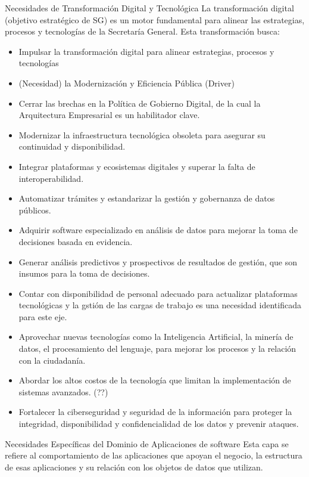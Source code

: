 \documentclass[
	a4paper, %
	12pt, %
]{include/CSSullivanBusinessReport}
\begin{document}
Necesidades de Transformación Digital y Tecnológica La transformación
digital (objetivo estratégico de SG) es un motor fundamental para
alinear las estrategias, procesos y tecnologías de la Secretaría
General. Esta transformación busca:

\begin{itemize}
\item
  Impulsar la transformación digital para alinear estrategias, procesos
  y tecnologías
\item
  (Necesidad) la Modernización y Eficiencia Pública (Driver)
\item
  Cerrar las brechas en la Política de Gobierno Digital, de la cual la
  Arquitectura Empresarial es un habilitador clave.
\item
  Modernizar la infraestructura tecnológica obsoleta para asegurar su
  continuidad y disponibilidad.
\item
  Integrar plataformas y ecosistemas digitales y superar la falta de
  interoperabilidad.
\item
  Automatizar trámites y estandarizar la gestión y gobernanza de datos
  públicos.
\item
  Adquirir software especializado en análisis de datos para mejorar la
  toma de decisiones basada en evidencia.
\item
  Generar análisis predictivos y prospectivos de resultados de gestión,
  que son insumos para la toma de decisiones.
\item
  Contar con disponibilidad de personal adecuado para actualizar
  plataformas tecnológicas y la gstión de las cargas de trabajo es una
  necesidad identificada para este eje.
\item
  Aprovechar nuevas tecnologías como la Inteligencia Artificial, la
  minería de datos, el procesamiento del lenguaje, para mejorar los
  procesos y la relación con la ciudadanía.
\item
  Abordar los altos costos de la tecnología que limitan la
  implementación de sistemas avanzados. (??)
\item
  Fortalecer la ciberseguridad y seguridad de la información para
  proteger la integridad, disponibilidad y confidencialidad de los datos
  y prevenir ataques.
\end{itemize}

Necesidades Específicas del Dominio de Aplicaciones de software Esta
capa se refiere al comportamiento de las aplicaciones que apoyan el
negocio, la estructura de esas aplicaciones y su relación con los
objetos de datos que utilizan.
\end{document}
